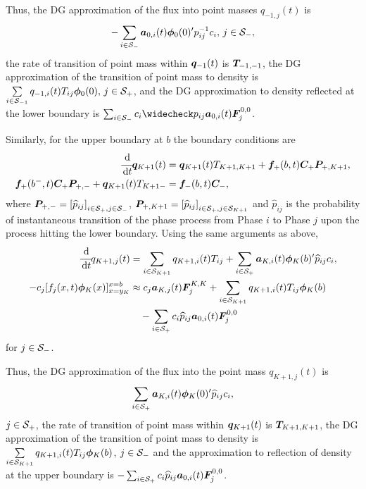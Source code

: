 Thus, the DG approximation of the flux into point masses \(q_{{-1},j}(t)\) is \[-\sum_{i\in\mathcal{S}_-}\boldsymbol a_{0,i}(t)\boldsymbol \phi_0(0)'{} p_{ij}^{-1} c_i,\,j\in\mathcal{S}_-,\] the rate of transition of point mass within \(\boldsymbol q_{{-1}}(t)\) is \(\boldsymbol T_{{-1},{-1}}\), the DG approximation of the transition of point mass to density is \(\sum\limits_{i\in\mathcal{S}_{-1}}q_{{-1},i}(t)T_{ij}\boldsymbol\phi_0(0),\,j\in\mathcal{S}_+\), and the DG approximation to density reflected at the lower boundary is \(\sum_{i\in\calS_-}c_i\widecheck p_{ij}\bs a_{0,i}(t)\bs F_j^{0,0}\). 

Similarly, for the upper boundary at \(b\) the boundary conditions are 
\begin{align*}
\cfrac{\, \mathrm{d}}{\, \mathrm{d} t}\boldsymbol q_{K+1}(t) &= \boldsymbol q_{K+1}(t) T_{{K+1}, {K+1}} + \boldsymbol f_+(b,t)\boldsymbol C_+\boldsymbol P_{+,{K+1}},\\
\boldsymbol f_+(b^-,t)\boldsymbol C_+\boldsymbol P_{+,-} + \boldsymbol q_{K+1}(t)T_{{K+1}-}&=\boldsymbol f_-(b,t)\boldsymbol C_-,
\end{align*}
where \(\boldsymbol P_{+,-} = \left[\widehat p_{ij}\right]_{i\in\mathcal{S}_+,j\in\mathcal{S}_{-}}\), \(\boldsymbol P_{+,K+1} = \left[\widehat p_{ij} \right]_{i\in\mathcal{S}_+,j\in\mathcal{S}_{K+1}}\) and \(\widehat p_{ij} \) is the probability of instantaneous transition of the phase process from Phase \(i\) to Phase \(j\) upon the process hitting the lower boundary. Using the same arguments as above, 
\begin{align*}
\cfrac{\, \mathrm{d}}{\, \mathrm{d} t} q_{{K+1},j}(t) &= \sum_{i\in\mathcal{S}_{K+1}}q_{{K+1},i}(t) T_{ij} + \sum_{i\in\mathcal{S}_+}\boldsymbol a_{K,i}(t)\boldsymbol \phi_K(b)'{}\widehat p_{ij} c_i,
\\-c_j[f_j(x,t)\boldsymbol\phi_K(x)]_{x=y_K}^{x=b} & \approx c_j\boldsymbol a_{K,j}(t)\boldsymbol F_j^{K,K}+\sum_{i\in\mathcal{S}_{K+1}}q_{{K+1},i}(t)T_{ij}\boldsymbol\phi_K(b) 
\\&\quad{} - \sum_{i\in\mathcal{S}_+}c_i\widehat p_{ij} \boldsymbol a_{0,i}(t)\boldsymbol F_j^{0,0}
\end{align*}
for \(j\in\mathcal{S}_-\). 

Thus, the DG approximation of the flux into the point mass \(q_{{K+1},j}(t)\) is 
\[\sum_{i\in\mathcal{S}_+}\boldsymbol a_{K,i}(t)\boldsymbol \phi_K(0)'{} \widehat p_{ij} c_i,\]
\(j\in\mathcal{S}_+\), the rate of transition of point mass within \(\boldsymbol q_{{K+1}}(t)\) is \(\boldsymbol T_{{K+1},{K+1}}\), the DG approximation of the transition of point mass to density is \(\sum\limits_{i\in\mathcal{S}_{K+1}}q_{{K+1},i}(t)T_{ij}\boldsymbol\phi_K(b)\), \(j\in\mathcal{S}_-\) and the approximation to reflection of density at the upper boundary is \(- \sum_{i\in\mathcal{S}_+}c_i\widehat p_{ij} \boldsymbol a_{0,i}(t)\boldsymbol F_j^{0,0}\). 

